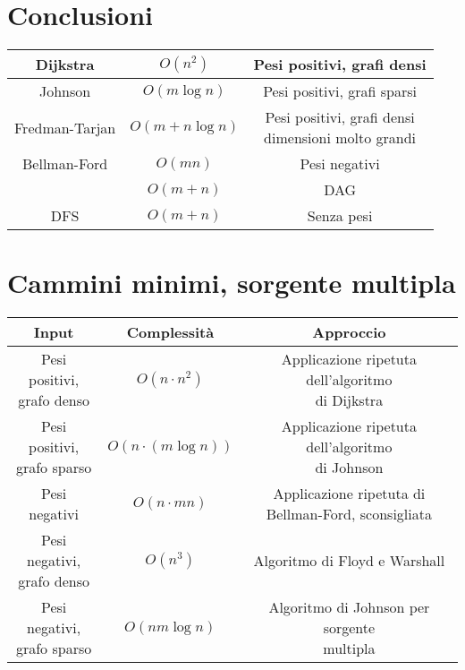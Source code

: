 \section{Conclusioni}
\begin{center}
\begin{tabular}{|c|c|c|}
	\hline
	Dijkstra & $O(n^2)$ & Pesi positivi, grafi densi\\
	\hline
	Johnson & $O(m\log n)$ & Pesi positivi, grafi sparsi\\
	\hline
	Fredman-Tarjan & $O(m+n\log n)$ & \makecell{Pesi positivi, grafi densi \\ dimensioni molto grandi}\\
	\hline
	Bellman-Ford & $O(mn)$ & Pesi negativi\\
	\hline
		     & $O(m+n)$ & DAG\\
	\hline
	DFS & $O(m+n)$ & Senza pesi\\
	\hline
\end{tabular}
\end{center}
\section{Cammini minimi, sorgente multipla}
\begin{center}
\begin{tabular}{|c|c|c|}
	\hline
	\textbf{Input} & \textbf{Complessit\`a} & \textbf{Approccio}\\
	\hline
	\makecell{Pesi positivi, \\ grafo denso} & $O(n\cdot n^2)$ & \makecell{Applicazione ripetuta dell'algoritmo \\ di Dijkstra}\\
	\hline
	\makecell{Pesi positivi, \\ grafo sparso}  & $O(n\cdot (m\log n))$ & \makecell{Applicazione ripetuta dell'algoritmo \\ di Johnson}\\
	\hline
	Pesi negativi & $O(n\cdot mn)$ & \makecell{Applicazione ripetuta di \\ Bellman-Ford, sconsigliata}\\
	\hline
	\makecell{Pesi negativi, \\ grafo denso} & $O(n^3)$ & Algoritmo di Floyd e Warshall\\
	\hline
	\makecell{Pesi negativi, \\ grafo sparso} & $O(nm\log n)$ & \makecell{Algoritmo di Johnson per sorgente \\ multipla}\\
	\hline
\end{tabular}
\end{center}
